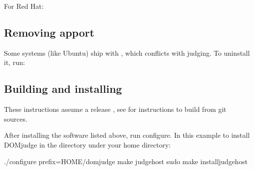 \documentclass[a4paper,10pt,english,openany]{sphinxmanual}
\begin{document}
\sphinxAtStartPar
For Red Hat:

\begin{sphinxVerbatim}[commandchars=\\\{\}]
        \PYGZbs{}
          
\end{sphinxVerbatim}


\subsection{Removing apport}
\label{\detokenize{install-judgehost:removing-apport}}
\sphinxAtStartPar
Some systems (like Ubuntu) ship with , which conflicts with judging.
To uninstall it, run:

\begin{sphinxVerbatim}[commandchars=\\\{\}]
   
\end{sphinxVerbatim}


\subsection{Building and installing}
\label{\detokenize{install-judgehost:building-and-installing}}\label{\detokenize{install-judgehost:installing-judgehost}}
\sphinxAtStartPar
These instructions assume a release , see {\hyperref[\detokenize{develop:bootstrap}]{}}
for instructions to build from git sources.

\sphinxAtStartPar
After installing the software listed above, run configure. In this
example to install DOMjudge in the directory  under your
home directory:

\begin{sphinxVerbatim}[commandchars=\\\{\}]
./configure \PYGZhy{}\PYGZhy{}prefix=\PYGZdl{}HOME/domjudge
make judgehost
sudo make install\PYGZhy{}judgehost
\end{sphinxVerbatim}
\end{document}
